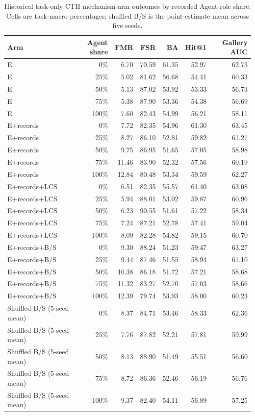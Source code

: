 \documentclass[10pt]{article}
\begin{document}
\begin{table}[ht]
\centering

\caption{Historical task-only CTH mechanism-arm outcomes by recorded Agent-role share. Cells are task-macro percentages; shuffled B/S is the point-estimate mean across five seeds.}
\label{tab:mechanism-shares}
\begin{tabular}{@{}lrrrrrr@{}}
\toprule Arm & Agent share & FMR & FSR & BA & Hit@1 & Gallery AUC \\
\midrule
E & 0\% & 6.70 & 70.59 & 61.35 & 52.97 & 62.73 \\
E & 25\% & 5.02 & 81.62 & 56.68 & 54.41 & 60.33 \\
E & 50\% & 5.13 & 87.02 & 53.92 & 53.33 & 56.73 \\
E & 75\% & 5.38 & 87.90 & 53.36 & 54.38 & 56.69 \\
E & 100\% & 7.60 & 82.43 & 54.99 & 56.21 & 58.11 \\
\midrule
E+records & 0\% & 7.72 & 82.35 & 54.96 & 61.30 & 63.45 \\
E+records & 25\% & 8.27 & 86.10 & 52.81 & 59.82 & 61.27 \\
E+records & 50\% & 9.75 & 86.95 & 51.65 & 57.05 & 58.98 \\
E+records & 75\% & 11.46 & 83.90 & 52.32 & 57.56 & 60.19 \\
E+records & 100\% & 12.84 & 80.48 & 53.34 & 59.59 & 62.27 \\
\midrule
E+records+LCS & 0\% & 6.51 & 82.35 & 55.57 & 61.40 & 63.08 \\
E+records+LCS & 25\% & 5.94 & 88.01 & 53.02 & 59.87 & 60.96 \\
E+records+LCS & 50\% & 6.23 & 90.55 & 51.61 & 57.22 & 58.34 \\
E+records+LCS & 75\% & 7.24 & 87.21 & 52.78 & 57.41 & 59.04 \\
E+records+LCS & 100\% & 8.09 & 82.28 & 54.82 & 59.15 & 60.70 \\
\midrule
E+records+B/S & 0\% & 9.30 & 88.24 & 51.23 & 59.47 & 63.27 \\
E+records+B/S & 25\% & 9.44 & 87.46 & 51.55 & 58.94 & 61.10 \\
E+records+B/S & 50\% & 10.38 & 86.18 & 51.72 & 57.21 & 58.68 \\
E+records+B/S & 75\% & 11.32 & 83.27 & 52.70 & 57.03 & 58.66 \\
E+records+B/S & 100\% & 12.39 & 79.74 & 53.93 & 58.00 & 60.23 \\
\midrule
Shuffled B/S (5-seed mean) & 0\% & 8.37 & 84.71 & 53.46 & 58.33 & 62.36 \\
Shuffled B/S (5-seed mean) & 25\% & 7.76 & 87.82 & 52.21 & 57.81 & 59.99 \\
Shuffled B/S (5-seed mean) & 50\% & 8.13 & 88.90 & 51.49 & 55.51 & 56.60 \\
Shuffled B/S (5-seed mean) & 75\% & 8.72 & 86.36 & 52.46 & 56.19 & 56.76 \\
Shuffled B/S (5-seed mean) & 100\% & 9.37 & 82.40 & 54.11 & 56.89 & 57.25 \\
\bottomrule
\end{tabular}
\end{table}
\end{document}
